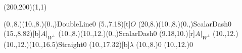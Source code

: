 \unitlength=1bp%

\begin{feynartspicture}(200,200)(1,1)

\FADiagram{}
\FAProp(0.,8.)(10.,8.)(0.,){DoubleLine}{0}
\FALabel(5.,7.18)[t]{$O$}
\FAProp(20,8.)(10.,8.)(0.,){ScalarDash}{0}
\FALabel(15.,8.82)[b]{$A|_{W^\perp}$}
\FAProp(10.,8.)(10.,12.)(0.,){ScalarDash}{0}
\FALabel(9.18,10.)[r]{$A|_{W^\perp}$}
\FAProp(10.,12.)(10.,12.)(10.,16.5){Straight}{0}
\FALabel(10.,17.32)[b]{$\lambda$}
\FAVert(10.,8.){0}
\FAVert(10.,12.){0}
\end{feynartspicture}

